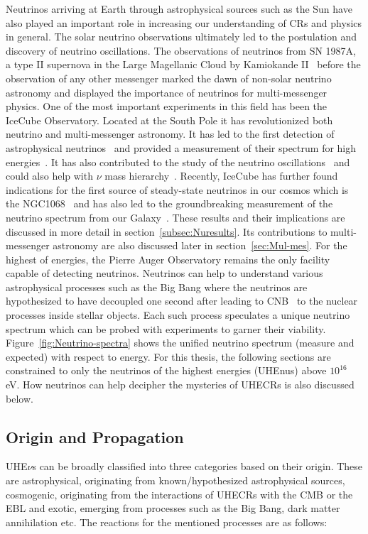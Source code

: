 Neutrinos arriving at Earth through astrophysical sources such as the Sun have also played an important role in increasing our understanding of \glspl{CR} and physics in general. The solar neutrino observations ultimately led to the postulation and discovery of neutrino oscillations. The observations of neutrinos from SN 1987A, a type II supernova in the Large Magellanic Cloud by Kamiokande II~\cite{PhysRevLett.58.1490} before the observation of any other messenger marked the dawn of non-solar neutrino astronomy and displayed the importance of neutrinos for multi-messenger physics. One of the most important experiments in this field has been the IceCube Observatory. Located at the South Pole it has revolutionized both neutrino and multi-messenger astronomy. It has led to the first detection of astrophysical neutrinos~\cite{PhysRevLett.111.021103} and provided a measurement of their spectrum for high energies~\cite{doi:10.1126/science.1242856}. It has also contributed to the study of the neutrino oscillations~\cite{Abbasi_2023_Oscillation} and could also help with $\nu$ mass hierarchy~\cite{psf2023008007}. Recently, IceCube has further found indications for the first source of steady-state neutrinos in our cosmos which is the NGC1068~\cite{Icecube_2022} and has also led to the groundbreaking measurement of the neutrino spectrum from our Galaxy~\cite{Galactic_plane_nu_2023}. These results and their implications are discussed in more detail in section~\ref{subsec:Nuresults}. Its contributions to multi-messenger astronomy are also discussed later in section~\ref{sec:Mul-mes}. For the highest of energies, the Pierre Auger Observatory remains the only facility capable of detecting neutrinos. 
Neutrinos can help to understand various astrophysical processes such as the Big Bang where the neutrinos are hypothesized to have decoupled one second after leading to \gls{CNB}~\cite{scott2024cosmicneutrinobackground} to the nuclear processes inside stellar objects. Each such process speculates a unique neutrino spectrum which can be probed with experiments to garner their viability. Figure~\ref{fig:Neutrino-spectra} shows the unified neutrino spectrum (measure and expected) with respect to energy. For this thesis, the following sections are constrained to only the neutrinos of the highest energies (\glspl{UHEnu}) above $10^{16}$ eV. How neutrinos can help decipher the mysteries of \glspl{UHECR} is also discussed below.

\subsection{Origin and Propagation}
\label{subsec:nuorig}
UHE$\nu$s can be broadly classified into three categories based on their origin. These are astrophysical, originating from known/hypothesized astrophysical sources, cosmogenic, originating from the interactions of \glspl{UHECR} with the \gls{CMB} or the \gls{EBL} and exotic, emerging from processes such as the Big Bang, dark matter annihilation etc. The reactions for the mentioned processes are as follows:
